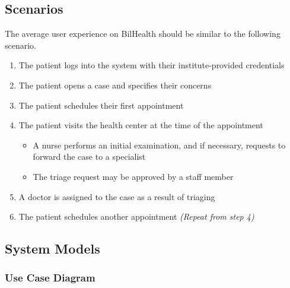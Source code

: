 \documentclass[a4paper, 12pt, titlepage]{article}
\begin{document}
  \subsection{Scenarios}

  The average user experience on BilHealth should be similar to the following scenario.

  \begin{enumerate}
    \item The patient logs into the system with their institute-provided credentials
    \item The patient opens a case and specifies their concerns
    \item The patient schedules their first appointment
    \item The patient visits the health center at the time of the appointment
    \begin{itemize}
      \item A nurse performs an initial examination, and if necessary, requests to forward the case to a specialist
      \item The triage request may be approved by a staff member
    \end{itemize}
    \item A doctor is assigned to the case as a result of triaging
    \item The patient schedules another appointment \textit{(Repeat from step 4)}
  \end{enumerate}

  \subsection{System Models}

  \pagebreak
  \subsubsection{Use Case Diagram}
\end{document}
